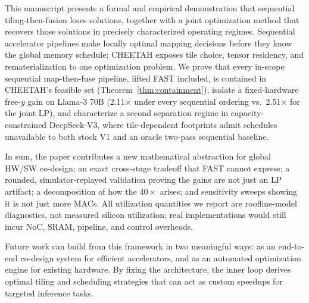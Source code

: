 This manuscript presents a formal and empirical demonstration that sequential tiling-then-fusion loses solutions, together with a joint optimization method that recovers those solutions in precisely characterized operating regimes.
Sequential accelerator pipelines make locally optimal mapping decisions before they know the global memory schedule; CHEETAH exposes tile choice, tensor residency, and rematerialization to one optimization problem.
We prove that every in-scope sequential map-then-fuse pipeline, lifted FAST included, is contained in CHEETAH's feasible set (Theorem~\ref{thm:containment}), isolate a fixed-hardware free-$y$ gain on Llama-3 70B (2.11$\times$ under every sequential ordering vs.\ 2.51$\times$ for the joint LP), and characterize a second separation regime in capacity-constrained DeepSeek-V3, where tile-dependent footprints admit schedules unavailable to both stock V1 and an oracle two-pass sequential baseline. 

In sum, the paper contributes a new mathematical abstraction for global HW/SW co-design; an exact cross-stage tradeoff that FAST cannot express; a rounded, simulator-replayed validation proving the gains are not just an LP artifact; a decomposition of how the $40\times$ arises; and sensitivity sweeps showing it is not just more MACs.
All utilization quantities we report are roofline-model diagnostics, not measured silicon utilization; real implementations would still incur NoC, SRAM, pipeline, and control overheads.

Future work can build from this framework in two meaningful ways: as an end-to-end co-design system for efficient accelerators, and as an automated optimization engine for existing hardware. By fixing the architecture, the inner loop derives optimal tiling and scheduling strategies that can act as custom speedups for targeted inference tasks.